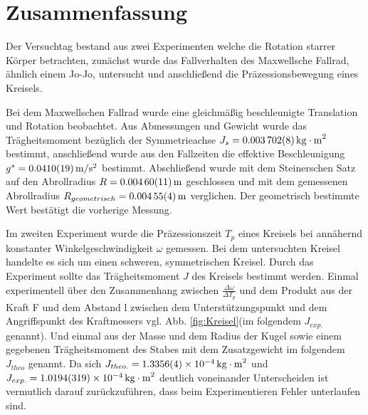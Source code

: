 
\section{Zusammenfassung}

Der Versuchtag bestand aus zwei Experimenten welche die Rotation starrer Körper betrachten, zunächst wurde das Fallverhalten des Maxwellsche Fallrad, ähnlich einem Jo-Jo, untersucht und anschließend die Präzessionsbewegung eines Kreisels. 



Bei dem Maxwellschen Fallrad wurde eine gleichmäßig beschleunigte Translation und Rotation beobachtet.
Aus Abmessungen und Gewicht wurde das Trägheitsmoment bezüglich der Symmetrieachse $J_s=\SI{0.003702 \pm 0.000008}{kg\cdot m^2}$ bestimmt, anschließend wurde aus den Fallzeiten die effektive Beschleunigung  $g^*=\SI{0.0410 \pm  0.0019}{m \per s \squared}$ bestimmt. Abschließend wurde mit dem Steinerschen Satz auf den Abrollradius $R=\SI{0.00460\pm 0.00011}{m}$ geschlossen und mit dem gemessenen Abrollradius $R_{geometrisch}=\SI{0.00455 \pm 0.00004}{m}$ verglichen. Der geometrisch bestimmte Wert bestätigt die vorherige Messung. 







Im zweiten Experiment wurde die Präzessionszeit $T_p$ eines Kreisels bei annähernd konstanter Winkelgeschwindigkeit $\omega$ gemessen. Bei dem untersuchten Kreisel handelte es sich um einen schweren, symmetrischen Kreisel.
Durch das Experiment sollte das Trägheitsmoment $J$ des Kreisels bestimmt werden. Einmal experimentell über den Zusammenhang zwischen $\frac{\Delta \omega}{\Delta T_p}$ und dem Produkt aus der Kraft F und dem Abstand l zwischen dem Unterstützungspunkt und dem Angriffspunkt des Kraftmessers vgl. Abb. \ref{fig:Kreisel}(im folgendem $J_{exp.}$ genannt). Und einmal aus der Masse und dem Radius der Kugel sowie einem gegebenen Trägheitsmoment des Stabes mit dem Zusatzgewicht im folgendem $J_{theo}$ genannt. Da sich $J_{theo.}=\SI{1,3356+-0,0004e-4}{kg \cdot m^2}$ und $J_{exp.}=\SI{1,0194+-0,0319e-4}{kg \cdot m^2}$ deutlich voneinander Unterscheiden ist vermutlich darauf zurückzuführen, dass beim Experimentieren Fehler unterlaufen sind.  
 










